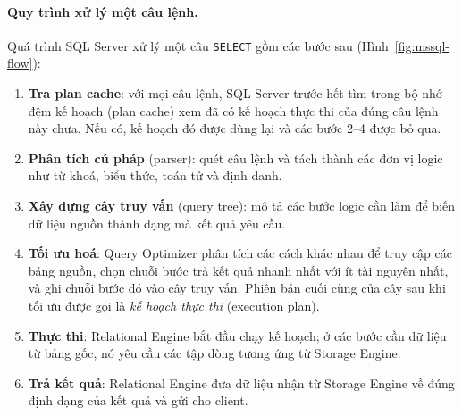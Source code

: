 \paragraph{Quy trình xử lý một câu lệnh.}
Quá trình SQL Server xử lý một câu \texttt{SELECT} gồm các bước sau (Hình~\ref{fig:mssql-flow}):
\begin{enumerate}
    \item \textbf{Tra plan cache}: với mọi câu lệnh, SQL Server trước hết tìm trong bộ nhớ đệm kế hoạch (plan cache) xem đã có kế hoạch thực thi của đúng câu lệnh này chưa. Nếu có, kế hoạch đó được dùng lại và các bước 2--4 được bỏ qua.
    \item \textbf{Phân tích cú pháp} (parser): quét câu lệnh và tách thành các đơn vị logic như từ khoá, biểu thức, toán tử và định danh.
    \item \textbf{Xây dựng cây truy vấn} (query tree): mô tả các bước logic cần làm để biến dữ liệu nguồn thành dạng mà kết quả yêu cầu.
    \item \textbf{Tối ưu hoá}: Query Optimizer phân tích các cách khác nhau để truy cập các bảng nguồn, chọn chuỗi bước trả kết quả nhanh nhất với ít tài nguyên nhất, và ghi chuỗi bước đó vào cây truy vấn. Phiên bản cuối cùng của cây sau khi tối ưu được gọi là \textit{kế hoạch thực thi} (execution plan).
    \item \textbf{Thực thi}: Relational Engine bắt đầu chạy kế hoạch; ở các bước cần dữ liệu từ bảng gốc, nó yêu cầu các tập dòng tương ứng từ Storage Engine.
    \item \textbf{Trả kết quả}: Relational Engine đưa dữ liệu nhận từ Storage Engine về đúng định dạng của kết quả và gửi cho client.
\end{enumerate}


